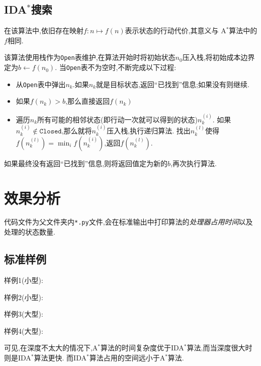     \subsection{IDA\(^*\)搜索}
    在该算法中,依旧存在映射\(f:n \mapsto f(n)\)表示状态的行动代价,其意义与
    A\(^*\)算法中的\(f\)相同.

    该算法使用栈作为\texttt{Open}表维护,在算法开始时将初始状态\(n_0\)压入栈,将初始成本边界定为\(b \leftarrow f(n_0)\).
    当\texttt{Open}表不为空时,不断完成以下过程:

    \begin{itemize}
        \item 从\texttt{Open}表中弹出\(n_k\).如果\(n_k\)就是目标状态,返回``已找到''信息;如果没有则继续.
        \item 如果\(f(n_k) > b\),那么直接返回\(f(n_k)\)
        \item 遍历\(n_k\)所有可能的相邻状态(即行动一次就可以得到的状态)\(n_k^{(i)}\).
        如果\(n_k^{(i)} \notin \texttt{Closed}\),那么就将\(n_k^{(i)}\)压入栈,执行递归算法.
        找出\(n_k^{(l)}\)使得\(f(n_k^{(l)}) = \min_{i} f (n_k^{(i)})\),返回\(f(n_k^{(l)})\).
    \end{itemize}

    如果最终没有返回``已找到''信息,则将返回值定为新的\(b\),再次执行算法.

    \section{效果分析}

    代码文件为父文件夹内\texttt{*.py}文件,会在标准输出中打印算法的\textit{处理器占用时间}以及处理的状态数量.

    \subsection{标准样例}

    样例1(小型):


    样例2(小型):


    样例3(大型):


    样例4(大型):


    可见,在深度不太大的情况下,A\(^*\)算法的时间复杂度优于IDA\(^*\)算法,而当深度很大时则是IDA\(^*\)算法更快.
    而IDA\(^*\)算法占用的空间远小于A\(^*\)算法.

